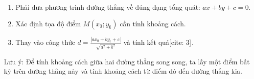 \begin{enumerate}
\item Phải đưa phương trình đường thẳng về đúng dạng tổng quát: $ax+by+c=0$.
\item Xác định tọa độ điểm $M(x_0; y_0)$ cần tính khoảng cách.
\item Thay vào công thức $d = \frac{|ax_0+by_0+c|}{\sqrt{a^2+b^2}}$ và tính kết quả[cite: 3].
\end{enumerate}
Lưu ý: Để tính khoảng cách giữa hai đường thẳng song song, ta lấy một điểm bất kỳ trên đường thẳng này và tính khoảng cách từ điểm đó đến đường thẳng kia.
